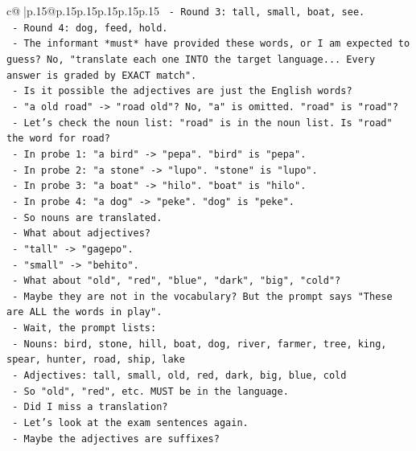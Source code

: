 \documentclass{article}
\begin{document}
{\begin{supertabular}{c@{$\;$}|p{.15\linewidth}@{}p{.15\linewidth}p{.15\linewidth}p{.15\linewidth}p{.15\linewidth}p{.15\linewidth}}
{{{\texttt{      {-} Round 3: tall, small, boat, see.} \\
\texttt{      {-} Round 4: dog, feed, hold.} \\
\texttt{    {-} The informant *must* have provided these words, or I am expected to guess? No, "translate each one INTO the target language... Every answer is graded by EXACT match".} \\
\texttt{    {-} Is it possible the adjectives are just the English words?} \\
\texttt{      {-} "a old road" {-}> "road old"? No, "a" is omitted. "road" is "road"?} \\
\texttt{      {-} Let's check the noun list: "road" is in the noun list. Is "road" the word for road?} \\
\texttt{      {-} In probe 1: "a bird" {-}> "pepa". "bird" is "pepa".} \\
\texttt{      {-} In probe 2: "a stone" {-}> "lupo". "stone" is "lupo".} \\
\texttt{      {-} In probe 3: "a boat" {-}> "hilo". "boat" is "hilo".} \\
\texttt{      {-} In probe 4: "a dog" {-}> "peke". "dog" is "peke".} \\
\texttt{      {-} So nouns are translated.} \\
\texttt{      {-} What about adjectives?} \\
\texttt{      {-} "tall" {-}> "gagepo".} \\
\texttt{      {-} "small" {-}> "behito".} \\
\texttt{      {-} What about "old", "red", "blue", "dark", "big", "cold"?} \\
\texttt{      {-} Maybe they are not in the vocabulary? But the prompt says "These are ALL the words in play".} \\
\texttt{      {-} Wait, the prompt lists:} \\
\texttt{        {-} Nouns: bird, stone, hill, boat, dog, river, farmer, tree, king, spear, hunter, road, ship, lake} \\
\texttt{        {-} Adjectives: tall, small, old, red, dark, big, blue, cold} \\
\texttt{      {-} So "old", "red", etc. MUST be in the language.} \\
\texttt{      {-} Did I miss a translation?} \\
\texttt{      {-} Let's look at the exam sentences again.} \\
\texttt{      {-} Maybe the adjectives are suffixes?} \\
}}}
\end{supertabular}}
\end{document}
